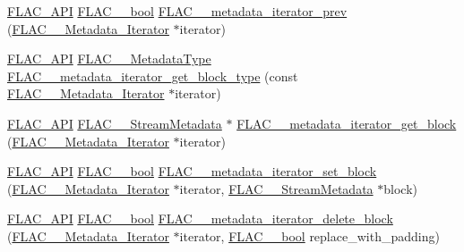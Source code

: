 \begin{DoxyCompactItemize}
\item 
\mbox{\hyperlink{group__flac__export_ga56ca07df8a23310707732b1c0007d6f5}{F\+L\+A\+C\+\_\+\+A\+PI}} \mbox{\hyperlink{ordinals_8h_a95103469f1cbd78b8cf250194985b34e}{F\+L\+A\+C\+\_\+\+\_\+bool}} \mbox{\hyperlink{group__flac__metadata__level2_ga003373a88bea6cea2df32f110a95e912}{F\+L\+A\+C\+\_\+\+\_\+metadata\+\_\+iterator\+\_\+prev}} (\mbox{\hyperlink{group__flac__metadata__level2_ga9f3e135a07cdef7e51597646aa7b89b2}{F\+L\+A\+C\+\_\+\+\_\+\+Metadata\+\_\+\+Iterator}} $\ast$iterator)
\item 
\mbox{\hyperlink{group__flac__export_ga56ca07df8a23310707732b1c0007d6f5}{F\+L\+A\+C\+\_\+\+A\+PI}} \mbox{\hyperlink{group__flac__format_gac71714ba8ddbbd66d26bb78a427fac01}{F\+L\+A\+C\+\_\+\+\_\+\+Metadata\+Type}} \mbox{\hyperlink{group__flac__metadata__level2_ga8221ea86b62119785c774aaece48a29b}{F\+L\+A\+C\+\_\+\+\_\+metadata\+\_\+iterator\+\_\+get\+\_\+block\+\_\+type}} (const \mbox{\hyperlink{group__flac__metadata__level2_ga9f3e135a07cdef7e51597646aa7b89b2}{F\+L\+A\+C\+\_\+\+\_\+\+Metadata\+\_\+\+Iterator}} $\ast$iterator)
\item 
\mbox{\hyperlink{group__flac__export_ga56ca07df8a23310707732b1c0007d6f5}{F\+L\+A\+C\+\_\+\+A\+PI}} \mbox{\hyperlink{struct_f_l_a_c_____stream_metadata}{F\+L\+A\+C\+\_\+\+\_\+\+Stream\+Metadata}} $\ast$ \mbox{\hyperlink{group__flac__metadata__level2_ga4a2b00a4312d178a9f55c2e2f8b08904}{F\+L\+A\+C\+\_\+\+\_\+metadata\+\_\+iterator\+\_\+get\+\_\+block}} (\mbox{\hyperlink{group__flac__metadata__level2_ga9f3e135a07cdef7e51597646aa7b89b2}{F\+L\+A\+C\+\_\+\+\_\+\+Metadata\+\_\+\+Iterator}} $\ast$iterator)
\item 
\mbox{\hyperlink{group__flac__export_ga56ca07df8a23310707732b1c0007d6f5}{F\+L\+A\+C\+\_\+\+A\+PI}} \mbox{\hyperlink{ordinals_8h_a95103469f1cbd78b8cf250194985b34e}{F\+L\+A\+C\+\_\+\+\_\+bool}} \mbox{\hyperlink{group__flac__metadata__level2_gab40c33a0bf35a2932a5c13f5230e0d9e}{F\+L\+A\+C\+\_\+\+\_\+metadata\+\_\+iterator\+\_\+set\+\_\+block}} (\mbox{\hyperlink{group__flac__metadata__level2_ga9f3e135a07cdef7e51597646aa7b89b2}{F\+L\+A\+C\+\_\+\+\_\+\+Metadata\+\_\+\+Iterator}} $\ast$iterator, \mbox{\hyperlink{struct_f_l_a_c_____stream_metadata}{F\+L\+A\+C\+\_\+\+\_\+\+Stream\+Metadata}} $\ast$block)
\item 
\mbox{\hyperlink{group__flac__export_ga56ca07df8a23310707732b1c0007d6f5}{F\+L\+A\+C\+\_\+\+A\+PI}} \mbox{\hyperlink{ordinals_8h_a95103469f1cbd78b8cf250194985b34e}{F\+L\+A\+C\+\_\+\+\_\+bool}} \mbox{\hyperlink{group__flac__metadata__level2_ga18fdaae4986696dc000cae6357810f7b}{F\+L\+A\+C\+\_\+\+\_\+metadata\+\_\+iterator\+\_\+delete\+\_\+block}} (\mbox{\hyperlink{group__flac__metadata__level2_ga9f3e135a07cdef7e51597646aa7b89b2}{F\+L\+A\+C\+\_\+\+\_\+\+Metadata\+\_\+\+Iterator}} $\ast$iterator, \mbox{\hyperlink{ordinals_8h_a95103469f1cbd78b8cf250194985b34e}{F\+L\+A\+C\+\_\+\+\_\+bool}} replace\+\_\+with\+\_\+padding)

\end{DoxyCompactItemize}
